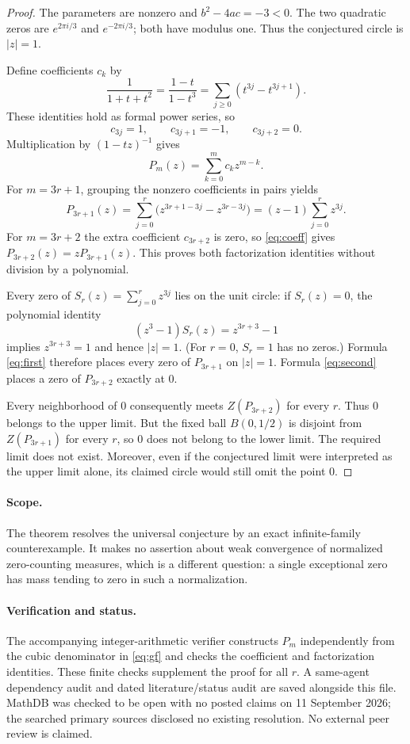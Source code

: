 \documentclass[11pt]{article}
\begin{document}
\begin{proof}
The parameters are nonzero and $b^2-4ac=-3<0$. The two quadratic zeros
are $e^{2\pi i/3}$ and $e^{-2\pi i/3}$; both have modulus one. Thus the
conjectured circle is $|z|=1$.

Define coefficients $c_k$ by
\[
 \frac1{1+t+t^2}=\frac{1-t}{1-t^3}
 =\sum_{j\geq0}(t^{3j}-t^{3j+1}).
\]
These identities hold as formal power series, so
\[
 c_{3j}=1,\qquad c_{3j+1}=-1,\qquad c_{3j+2}=0.
\]
Multiplication by $(1-tz)^{-1}$ gives
\begin{equation}\label{eq:coeff}
 P_m(z)=\sum_{k=0}^{m}c_k z^{m-k}.
\end{equation}
For $m=3r+1$, grouping the nonzero coefficients in pairs yields
\[
 P_{3r+1}(z)
 =\sum_{j=0}^{r}\bigl(z^{3r+1-3j}-z^{3r-3j}\bigr)
 =(z-1)\sum_{j=0}^{r}z^{3j}.
\]
For $m=3r+2$ the extra coefficient $c_{3r+2}$ is zero,
so \eqref{eq:coeff} gives $P_{3r+2}(z)=zP_{3r+1}(z)$.
This proves both factorization identities without division by a polynomial.

Every zero of $S_r(z)=\sum_{j=0}^{r}z^{3j}$ lies on the unit circle:
if $S_r(z)=0$, the polynomial identity
\[
 (z^3-1)S_r(z)=z^{3r+3}-1
\]
implies $z^{3r+3}=1$ and hence $|z|=1$.
(For $r=0$, $S_r=1$ has no zeros.) Formula \eqref{eq:first}
therefore places every zero of $P_{3r+1}$ on $|z|=1$.
Formula \eqref{eq:second} places a zero of $P_{3r+2}$ exactly at $0$.

Every neighborhood of $0$ consequently meets $Z(P_{3r+2})$ for every $r$.
Thus $0$ belongs to the upper limit. But the fixed ball $B(0,1/2)$
is disjoint from $Z(P_{3r+1})$ for every $r$, so $0$ does not belong
to the lower limit. The required limit does not exist.
Moreover, even if the conjectured limit were interpreted as the upper
limit alone, its claimed circle would still omit the point $0$.
\end{proof}

\paragraph{Scope.}
The theorem resolves the universal conjecture by an exact infinite-family
counterexample. It makes no assertion about weak convergence of normalized
zero-counting measures, which is a different question: a single exceptional
zero has mass tending to zero in such a normalization.

\paragraph{Verification and status.}
The accompanying integer-arithmetic verifier constructs $P_m$ independently
from the cubic denominator in \eqref{eq:gf} and checks the coefficient and
factorization identities. These finite checks supplement the proof for all
$r$. A same-agent dependency audit and dated literature/status audit are
saved alongside this file. MathDB was checked to be open with no posted
claims on 11 September 2026; the searched primary sources disclosed no
existing resolution. No external peer review is claimed.
\end{document}
